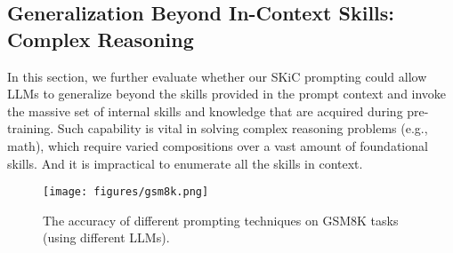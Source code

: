 \subsection{Generalization Beyond In-Context Skills: Complex Reasoning}
In this section, we further evaluate whether our SKiC prompting could allow LLMs to generalize beyond the skills provided in the prompt context and invoke the massive set of internal skills and knowledge that are acquired during pre-training. 
Such capability is vital in solving complex reasoning problems (e.g., math), which require varied compositions over a vast amount of foundational skills. And it is impractical to enumerate all the skills in context.

\begin{figure*}[t]
\vskip 0.2in
\begin{center}
\centerline{\texttt{[image: figures/gsm8k.png]}}
\caption{The accuracy of different prompting techniques on GSM8K tasks (using different LLMs).} 
\label{fig:gsm8k_results}
\end{center}
\vskip -0.2in
\end{figure*}

